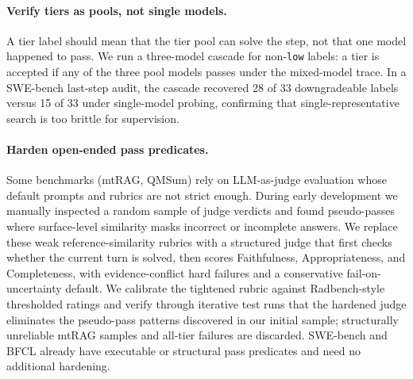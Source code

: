 \paragraph{Verify tiers as pools, not single models.}
A tier label should mean that the tier pool can solve the step, not that one
model happened to pass. We run a three-model cascade for non-\texttt{low}
labels: a tier is accepted if any of the three pool models passes under the
mixed-model trace. In a SWE-bench last-step audit, the cascade recovered 28 of
33 downgradeable labels versus 15 of 33 under single-model probing, confirming
that single-representative search is too brittle for supervision.

\paragraph{Harden open-ended pass predicates.}
Some benchmarks (mtRAG, QMSum) rely on LLM-as-judge evaluation whose default
prompts and rubrics are not strict enough. During early development we manually
inspected a random sample of judge verdicts and found pseudo-passes where
surface-level similarity masks incorrect or incomplete answers. We replace these
weak reference-similarity rubrics with a structured judge that first checks
whether the current turn is solved, then scores Faithfulness, Appropriateness,
and Completeness, with evidence-conflict hard failures and a conservative
fail-on-uncertainty default. We calibrate the tightened rubric against
Radbench-style thresholded ratings \citep{kuo2025radbench} and verify through
iterative test runs that the hardened judge eliminates the pseudo-pass patterns
discovered in our initial sample; structurally
unreliable mtRAG samples and all-tier failures are discarded. SWE-bench and
BFCL already have executable or structural pass predicates and need no
additional hardening.

